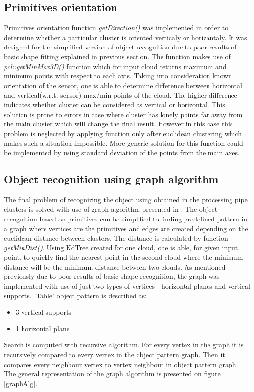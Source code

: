 \documentclass[fontsize=12pt]{article}
\begin{document}
\subsection{Primitives orientation}
Primitives orientation function \emph{getDirection()} was implemented in order to determine whether a particular cluster is oriented verticaly or horizantaly. It was designed for the simplified version of object recognition due to poor results of basic shape fitting explained in previous section.\newline
\indent The function makes use of \emph{pcl::getMinMax3D()} function which for input cloud returns maximum and minimum points with respect to each axis. Taking into consideration known orientation of the sensor, one is able to determine difference between horizontal and vertical(w.r.t. sensor) max/min points of the cloud. The higher difference indicates whether cluster can be considered as vertical or horizontal. This solution is prone to errors in case where cluster has lonely points far away from the main cluster which will change the final result. However in this case this problem is neglected by applying function only after euclidean clustering which makes such a situation impossible. More generic solution for this function could be implemented by using standard deviation of the points from the main axes.

\subsection{Object recognition using graph algorithm}
The final problem of recognizing the object using obtained in the processing pipe clusters is solved with use of graph algorithm presented in \cite{graph}. The object recognition based on primitives can be simplified to finding predefined pattern in a graph where vertices are the primitives and edges are created depending on the euclidean distance between clusters. \newline
\indent The distance is calculated by function \emph{getMinDist()}. Using KdTree created for one cloud, one is able, for given input point, to quickly find the nearest point in the second cloud where the minimum distance will be the minimum distance between two clouds.\newline
\indent As mentioned previously due to poor results of basic shape recognition, the graph was implemented with use of just two types of vertices - horizontal planes and vertical supports. 'Table' object pattern is described as:
\begin{itemize}
  \item 3 vertical supports
  \item 1 horizontal plane
\end{itemize}
Search is computed with recursive algorithm. For every vertex in the graph it is recursively compared to every vertex in the object pattern graph. 
Then it compares every neighbour vertex to vertex neighbour in object pattern graph. The general representation of the graph algorithm is presented on figure \ref{graphAlg}.
\end{document}
